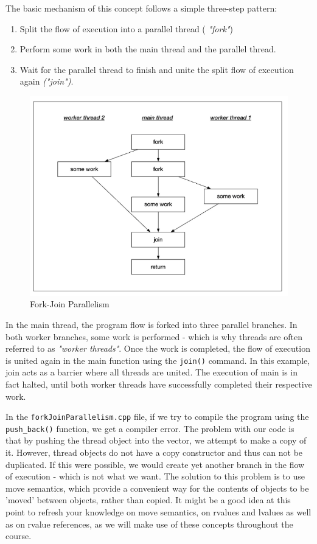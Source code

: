 \documentclass[11pt, a4paper]{article}
\begin{document}
The basic mechanism of this concept follows a simple three-step pattern:

\begin{enumerate}
	\item Split the flow of execution into a parallel thread ( \textit{"fork"})
	\item Perform some work in both the main thread and the parallel thread.
	\item Wait for the parallel thread to finish and unite the split flow of execution again \textit{("join")}.
\end{enumerate}





\begin{figure}[htpb!]
	\centering
	\includegraphics[width=0.8\linewidth]{fork_join}
	\caption{Fork-Join Parallelism}
	\label{fig:fork_join_parallelism}
\end{figure}

In the main thread, the program flow is forked into three parallel branches. In both worker branches, some work is performed - which is why threads are often referred to as \textit{"worker threads"}. Once the work is completed, the flow of execution is united again in the main function using the \texttt{join()}  command. In this example, join acts as a barrier where all threads are united. The execution of main is in fact halted, until both worker threads have successfully completed their respective work. 



In the \texttt{forkJoinParallelism.cpp} file, if we try to compile the program using the \texttt{push\_back()} function, we get a compiler error. The problem with our code is that by pushing the thread object into the vector, we attempt to make a copy of it. However, thread objects do not have a copy constructor and thus can not be duplicated. If this were possible, we would create yet another branch in the flow of execution - which is not what we want. The solution to this problem is to use move semantics, which provide a convenient way for the contents of objects to be 'moved' between objects, rather than copied. It might be a good idea at this point to refresh your knowledge on move semantics, on rvalues and lvalues as well as on rvalue references, as we will make use of these concepts throughout the course.
\end{document}

